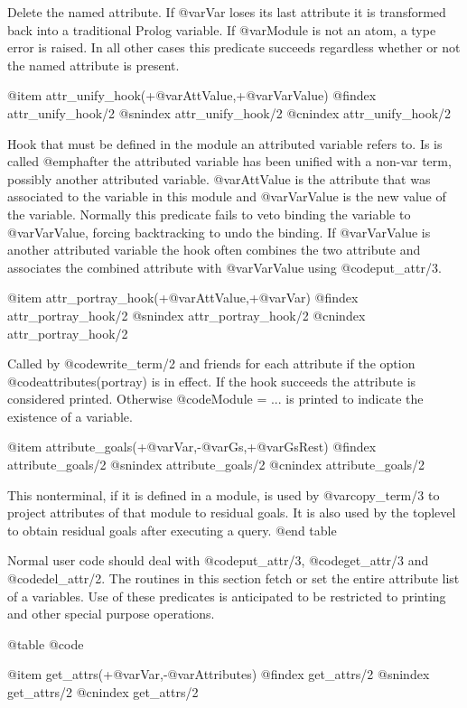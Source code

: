 {{{{{{{{{Delete the named attribute.  If @var{Var} loses its last attribute it
is transformed back into a traditional Prolog variable.  If @var{Module}
is not an atom, a type error is raised. In all other cases this
predicate succeeds regardless whether or not the named attribute is
present.

@item attr_unify_hook(+@var{AttValue},+@var{VarValue})
@findex attr_unify_hook/2
@snindex attr_unify_hook/2
@cnindex attr_unify_hook/2

Hook that must be defined in the module an attributed variable refers
to. Is is called @emph{after} the attributed variable has been
unified with a non-var term, possibly another attributed variable.
@var{AttValue} is the attribute that was associated to the variable
in this module and @var{VarValue} is the new value of the variable.
Normally this predicate fails to veto binding the variable to
@var{VarValue}, forcing backtracking to undo the binding.  If
@var{VarValue} is another attributed variable the hook often combines
the two attribute and associates the combined attribute with
@var{VarValue} using @code{put_attr/3}.

@item attr_portray_hook(+@var{AttValue},+@var{Var})
@findex attr_portray_hook/2
@snindex attr_portray_hook/2
@cnindex attr_portray_hook/2

Called by @code{write_term/2} and friends for each attribute if the option
@code{attributes(portray)} is in effect.  If the hook succeeds the
attribute is considered printed.  Otherwise  @code{Module = ...} is
printed to indicate the existence of a variable.

@item attribute_goals(+@var{Var},-@var{Gs},+@var{GsRest})
@findex attribute_goals/2
@snindex attribute_goals/2
@cnindex attribute_goals/2

This nonterminal, if it is defined in a module, is used by @var{copy_term/3}
to project attributes of that module to residual goals. It is also
used by the toplevel to obtain residual goals after executing a query.
@end table

Normal user code should deal with @code{put_attr/3}, @code{get_attr/3} and @code{del_attr/2}.
The routines in this section fetch or set the entire attribute list of a
variables. Use of these predicates is anticipated to be restricted to
printing and other special purpose operations.

@table @code

@item get_attrs(+@var{Var},-@var{Attributes})
@findex get_attrs/2
@snindex get_attrs/2
@cnindex get_attrs/2

}}}}}}}}}
